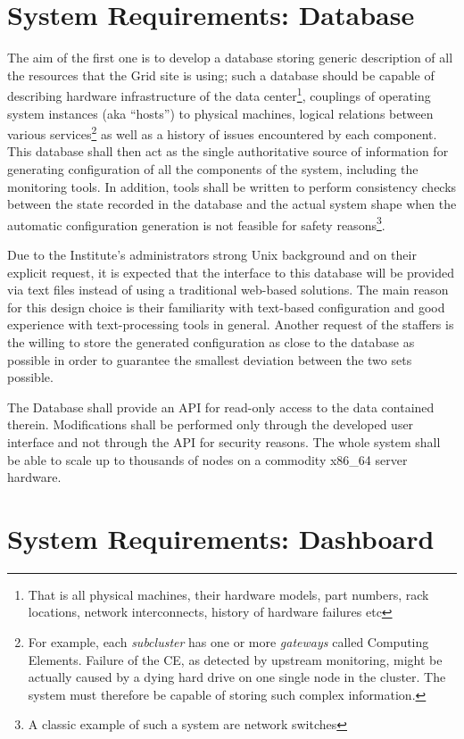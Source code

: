 \documentclass[12pt]{article}
\begin{document}
\section{System Requirements: Database}

The aim of the first one is to develop a database storing generic description of all the resources that the Grid site is using;
such a database should be capable of describing hardware infrastructure of the data center\footnote{That is all physical machines,
their hardware models, part numbers, rack locations, network interconnects, history of hardware failures etc}, couplings of
operating system instances (aka ``hosts'') to physical machines, logical relations between various services\footnote{For example,
each {\em subcluster} has one or more {\em gateways} called Computing Elements.  Failure of the CE, as detected by upstream
monitoring, might be actually caused by a dying hard drive on one single node in the cluster.  The system must therefore be
capable of storing such complex information.} as well as a history of issues encountered by each component.  This database shall
then act as the single authoritative source of information for generating configuration of all the components of the system,
including the monitoring tools.  In addition, tools shall be written to perform consistency checks between the state recorded in
the database and the actual system shape when the automatic configuration generation is not feasible for safety reasons\footnote{A
classic example of such a system are network switches}.

Due to the Institute's administrators strong Unix background and on their explicit request, it is expected that the interface to
this database will be provided via text files instead of using a traditional web-based solutions.  The main reason for this design
choice is their familiarity with text-based configuration and good experience with text-processing tools in general.  Another
request of the staffers is the willing to store the generated configuration as close to the database as possible in order to
guarantee the smallest deviation between the two sets possible.

The Database shall provide an API for read-only access to the data contained therein.  Modifications shall be performed only
through the developed user interface and not through the API for security reasons.  The whole system shall be able to scale up to
thousands of nodes on a commodity x86\_64 server hardware.

\section{System Requirements: Dashboard}
\end{document}
